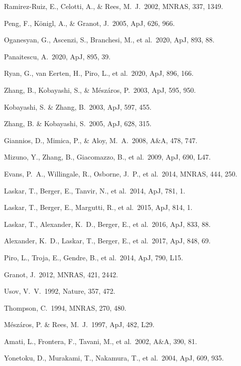 \documentclass{naturesubmissionstyle}
\newcommand\aap{A\&A}                %
\newcommand\apj{ApJ}                 %
\newcommand\apjl{ApJ}                %
\newcommand\mnras{MNRAS}             %
\newcommand\nat{Nature}              %
\begin{document}
\begin{thebibliography}{10}
 Ramirez-Ruiz, E., Celotti, A., \& Rees, M.~J.\ 2002, \mnras, 337, 1349. 

 Peng, F., K{\"o}nigl, A., \& Granot, J.\ 2005, \apj, 626, 966. 

 Oganesyan, G., Ascenzi, S., Branchesi, M., et al.\ 2020, \apj, 893, 88. 

 Panaitescu, A.\ 2020, \apj, 895, 39. 

 Ryan, G., van Eerten, H., Piro, L., et al.\ 2020, \apj, 896, 166. 

 Zhang, B., Kobayashi, S., \& M{\'e}sz{\'a}ros, P.\ 2003, \apj, 595, 950. 

 Kobayashi, S. \& Zhang, B.\ 2003, \apj, 597, 455. 

 Zhang, B. \& Kobayashi, S.\ 2005, \apj, 628, 315. 

 Giannios, D., Mimica, P., \& Aloy, M.~A.\ 2008, \aap, 478, 747. 

 Mizuno, Y., Zhang, B., Giacomazzo, B., et al.\ 2009, \apjl, 690, L47. 

 Evans, P.~A., Willingale, R., Osborne, J.~P., et al.\ 2014, \mnras, 444, 250. 


 Laskar, T., Berger, E., Tanvir, N., et al.\ 2014, \apj, 781, 1. 

 Laskar, T., Berger, E., Margutti, R., et al.\ 2015, \apj, 814, 1. 

 Laskar, T., Alexander, K.~D., Berger, E., et al.\ 2016, \apj, 833, 88. 

 Alexander, K.~D., Laskar, T., Berger, E., et al.\ 2017, \apj, 848, 69. 

 Piro, L., Troja, E., Gendre, B., et al.\ 2014, \apjl, 790, L15. 


 Granot, J.\ 2012, \mnras, 421, 2442. 

 Usov, V.~V.\ 1992, \nat, 357, 472. 

 Thompson, C.\ 1994, \mnras, 270, 480. 

 M{\'e}sz{\'a}ros, P. \& Rees, M.~J.\ 1997, \apjl, 482, L29. 

 Amati, L., Frontera, F., Tavani, M., et al.\ 2002, \aap, 390, 81. 

 Yonetoku, D., Murakami, T., Nakamura, T., et al.\ 2004, \apj, 609, 935. 


\end{thebibliography}
\end{document}
